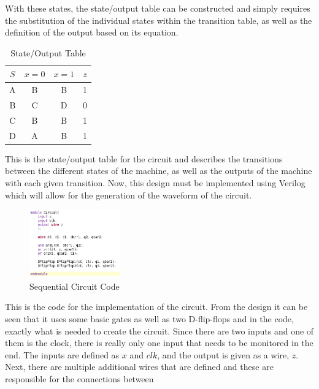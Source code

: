 \documentclass[12pt]{article}
\begin{document}
    \par With these states, the state/output table can be constructed and simply
    requires the substitution of the individual states within the transition
    table, as well as the definition of the output based on its equation.
    \begin{table}[h]
        \centering
        \begin{tabular}{c|cc|c}
            \toprule
            $S$ & $x=0$ & $x=1$ & $z$ \\
            \midrule
            A & B & B & 1 \\
            B & C & D & 0 \\
            C & B & B & 1 \\
            D & A & B & 1 \\
            \bottomrule
        \end{tabular}
        \caption{State/Output Table}
    \end{table}
    \par This is the state/output table for the circuit and describes the
    transitions between the different states of the machine, as well as the
    outputs of the machine with each given transition. Now, this design must be
    implemented using Verilog which will allow for the generation of the
    waveform of the circuit.
    \newpage
    \begin{figure}[h]
        \centering
        \includegraphics[width=0.35\textwidth]{Sequential Circuit Code.png}
        \caption{Sequential Circuit Code}
    \end{figure}
    \par This is the code for the implementation of the circuit. From the design
    it can be seen that it uses some basic gates as well as two D-flip-flops and
    in the code, exactly what is needed to create the circuit. Since there are
    two inputs and one of them is the clock, there is really only one input that
    needs to be monitored in the end. The inputs are defined as $x$ and $clk$,
    and the output is given as a wire, $z$. Next, there are multiple additional
    wires that are defined and these are responsible for the connections between
\end{document}

